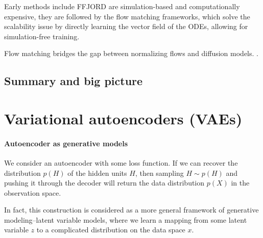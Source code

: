 \documentclass{mytufte-light}
\begin{document}
Early methods include FFJORD are simulation-based and computationally expensive,
they are followed by the flow matching frameworks,
which solve the scalability issue by directly learning 
the vector field of the ODEs, allowing for simulation-free training.

Flow matching bridges the gap between normalizing flows and diffusion models.
\href{https://diffusion.csail.mit.edu/2026/index.html}{\color{blue}{Reference for further reading}}.


\subsection{Summary and big picture}


\section{Variational autoencoders (VAEs)}
\paragraph{
Autoencoder as generative models
}
We consider an autoencoder with some loss function. If we can recover the distribution \( p(H) \) of 
the hidden units \( H \), then sampling \( H\sim p(H) \) and pushing it through the 
decoder will return the data distribution \( p(X) \) in the observation space.

In fact, this construction is considered as a more general framework of generative modeling--latent variable models,
where we learn a mapping from some latent variable \( z \) to a complicated distribution on the data space \( x \).






\makeatletter
  \renewcommand{\section}{\@startsection{section}%
    {3}{0.8em}{-3ex \@plus -1ex \@minus -.2ex}%
    {1.5ex \@plus .2ex}
    {\hspace*{-5.5em}\fcolorbox{SectionBox}{SectionBox}{\parbox[c][1.0ex][b]{4em}{\phantom{space}}}
    \normalfont\Large\itshape\color{blue}}}
\makeatother



\end{document}
